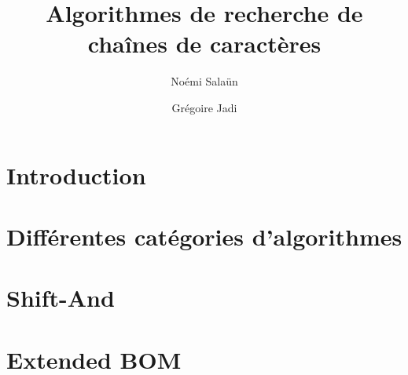 \documentclass[a4paper,11pt]{article}
\begin{document}
\title{Algorithmes de recherche de chaînes de caractères}
\author{Noémi Salaün \and{} Grégoire Jadi}

\maketitle

\section{Introduction}

\section{Différentes catégories d'algorithmes}

\section{Shift-And}

\section{Extended BOM}
\end{document}
